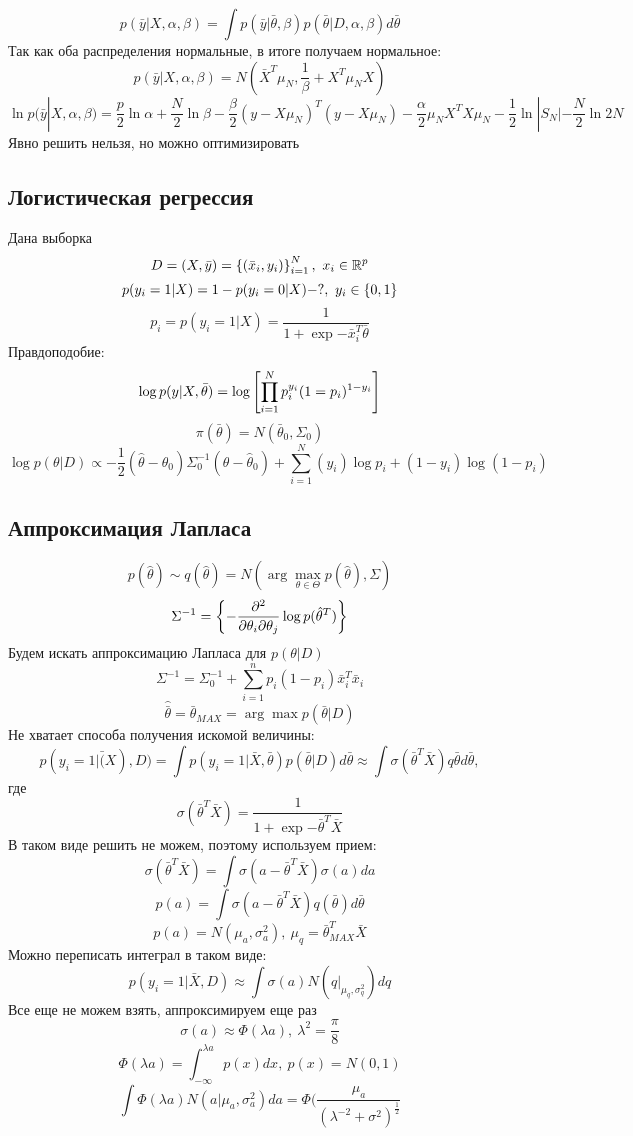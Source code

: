 $$ p(\bar{y}|X, \alpha, \beta) = \int p(\bar{y}|\bar{\theta}, \beta) p(\bar{\theta}|D, \alpha, \beta) d\bar{\theta} $$
Так как оба распределения нормальные, в итоге получаем нормальное:
$$ p(\bar{y}|X, \alpha, \beta) = N(\bar{X}^T\mu_N, \frac{1}{\beta} + X^T\mu_N X) $$
$$ \ln p(\bar{y}|X, \alpha, \beta) = \frac{p}{2} \ln \alpha + \frac{N}{2}\ln \beta - \frac{\beta}{2}(y-X \mu_N)^T(y - X\mu_N) - \frac{\alpha}{2}\mu_N X^T X \mu_N - \frac{1}{2} \ln |S_N| - \frac{N}{2} \ln 2N$$
Явно решить нельзя, но можно оптимизировать

\subsection*{Логистическая регрессия}
Дана выборка
$$ D = (X, \bar{y}) = \left\{ (\bar{x}_i, y_i) \right\}_{i=1}^N, \ x_i \in \mathbb{R}^p $$
$$ p(y_i=1|X) = 1 - p(y_i=0|X) - ?, \ y_i \in \left\{ 0,1 \right\} $$
$$ p_i = p(y_i=1|X) = \frac{1}{1+\exp{-\bar{x}_i^T\bar{\theta}}} $$
Правдоподобие: 
$$ \log p(y|X, \bar{\theta}) = \log \left[  \prod_{i=1}^N p_i^{y_i}(1=p_i)^{1-y_i} \right]$$
$$ \pi(\bar{\theta}) = N(\bar{\theta}_0, \Sigma_0) $$
$$ \log p(\theta|D) \propto -\frac{1}{2}(\hat{\theta} - \theta_0)\Sigma_0^{-1}(\hat{\theta} - \hat{\theta}_0) + \sum_{i=1}^N(y_i) \log p_i + (1-y_i) \log (1-p_i) $$
\subsection*{Аппроксимация Лапласа}
$$ p(\hat{\theta}) \sim q(\hat{\theta}) = N(\arg \max_{\theta \in \Theta} p(\hat{\theta}), \Sigma ) $$
$$ \Sigma^{-1} = \left\{ -\frac{\partial^2}{\partial\theta_i \partial\theta_j} \log p(\hat{\theta}^T) \right\} $$
Будем искать аппроксимацию Лапласа для $p(\theta|D)$
$$ \Sigma^{-1} = \Sigma_0^{-1} + \sum_{i=1}^n p_i(1-p_i)\bar{x}_i^T\bar{x}_i $$
$$ \hat{\bar{\theta}} = \bar{\theta}_{MAX} = \arg \max p(\bar{\theta}|D) $$
Не хватает способа получения искомой величины:
$$ p(y_i=1|\bar(X), D) = \int p(y_i=1|\bar{X}, \bar{\theta})p(\bar{\theta}|D) d\bar{\theta} \approx \int \sigma(\bar{\theta}^T \bar{X}) q{\bar{\theta}} d\bar{\theta}, $$
где $$\sigma(\bar{\theta}^T\bar{X}) = \frac{1}{1+\exp{-\bar{\theta}^T\bar{X}}}$$
В таком виде решить не можем, поэтому используем прием: 
$$ \sigma(\bar{\theta}^T\bar{X}) = \int \sigma(a - \bar{\theta}^T\bar{X}) \sigma(a)da $$
$$ p(a) = \int \sigma(a - \bar{\theta}^T\bar{X}) q(\bar{\theta}) d\bar{\theta} $$
$$ p(a) = N(\mu_a, \sigma_a^2), \ \mu_q = \bar{\theta}_{MAX}^T \bar{X} $$
Можно переписать интеграл в таком виде:
$$ p(y_i=1|\bar{X}, D) \approx \int \sigma(a)N(q|_{\mu_q, \sigma_q^2})dq $$
Все еще не можем взять, аппроксимируем еще раз
$$ \sigma(a) \approx \Phi(\lambda a), \ \lambda^2 = \frac{\pi}{8}$$
$$ \Phi(\lambda a) = \int_{-\infty}^{\lambda a} p(x)dx, \ p(x) = N(0,1) $$
$$ \int \Phi(\lambda a)  N(a| \mu_a, \sigma_a^2) da = \Phi(\frac{\mu_a}{(\lambda^{-2} + \sigma^2)^{\frac{1}{2}}}$$

